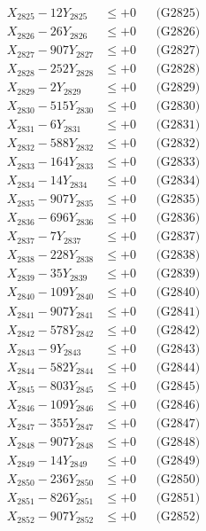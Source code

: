 \documentclass[a4paper,10pt]{article}
\begin{document}
{\begin{align}
X_{2825} - 12Y_{2825} &\leq +0 && \text{(G2825)} \\
X_{2826} - 26Y_{2826} &\leq +0 && \text{(G2826)} \\
X_{2827} - 907Y_{2827} &\leq +0 && \text{(G2827)} \\
X_{2828} - 252Y_{2828} &\leq +0 && \text{(G2828)} \\
X_{2829} - 2Y_{2829} &\leq +0 && \text{(G2829)} \\
X_{2830} - 515Y_{2830} &\leq +0 && \text{(G2830)} \\
\allowbreak
X_{2831} - 6Y_{2831} &\leq +0 && \text{(G2831)} \\
X_{2832} - 588Y_{2832} &\leq +0 && \text{(G2832)} \\
X_{2833} - 164Y_{2833} &\leq +0 && \text{(G2833)} \\
X_{2834} - 14Y_{2834} &\leq +0 && \text{(G2834)} \\
X_{2835} - 907Y_{2835} &\leq +0 && \text{(G2835)} \\
X_{2836} - 696Y_{2836} &\leq +0 && \text{(G2836)} \\
X_{2837} - 7Y_{2837} &\leq +0 && \text{(G2837)} \\
X_{2838} - 228Y_{2838} &\leq +0 && \text{(G2838)} \\
X_{2839} - 35Y_{2839} &\leq +0 && \text{(G2839)} \\
X_{2840} - 109Y_{2840} &\leq +0 && \text{(G2840)} \\
\allowbreak
X_{2841} - 907Y_{2841} &\leq +0 && \text{(G2841)} \\
X_{2842} - 578Y_{2842} &\leq +0 && \text{(G2842)} \\
X_{2843} - 9Y_{2843} &\leq +0 && \text{(G2843)} \\
X_{2844} - 582Y_{2844} &\leq +0 && \text{(G2844)} \\
X_{2845} - 803Y_{2845} &\leq +0 && \text{(G2845)} \\
X_{2846} - 109Y_{2846} &\leq +0 && \text{(G2846)} \\
X_{2847} - 355Y_{2847} &\leq +0 && \text{(G2847)} \\
X_{2848} - 907Y_{2848} &\leq +0 && \text{(G2848)} \\
X_{2849} - 14Y_{2849} &\leq +0 && \text{(G2849)} \\
X_{2850} - 236Y_{2850} &\leq +0 && \text{(G2850)} \\
\allowbreak
X_{2851} - 826Y_{2851} &\leq +0 && \text{(G2851)} \\
X_{2852} - 907Y_{2852} &\leq +0 && \text{(G2852)} \\

\end{align}}
\end{document}
